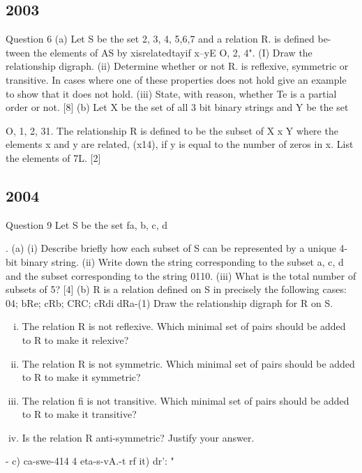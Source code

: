\subsection{2003}
Question 6 (a) Let S be the set {2, 3, 4, 5,6,7} and a relation R. is defined be-
tween the elements of AS by 
xisrelatedtayif x--yE {O, 2, 4}". 
(I) Draw the relationship digraph. 
(ii) Determine whether or not R. is reflexive, symmetric or transitive. In cases 
where one of these properties does not hold give an example to show that 
it does not hold. 
(iii) State, with reason, whether Te is a partial order or not. 
[8] 
(b) Let X be the set of all 3 bit binary strings and Y be the set {O, 1, 2, 31. The 
relationship R is defined to be the subset of X x Y where the elements x and y 
are related, (x14), if y is equal to the number of zeros in x. List the elements 
of 7L. [2] 

\subsection{2004} 
Question 9 Let S be the set fa, b, c, d}. 
(a) (i) Describe briefly how each subset of S can be represented by a unique 4-bit 
binary string. 
(ii) Write down the string corresponding to the subset {a, c, d} and the subset 
corresponding to the string 0110. 
(iii) What is the total number of subsets of 5? [4] 
(b) R is a relation defined on S in precisely the following cases: 
04; bRe; cRb; CRC; cRdi dRa-(1) Draw the relationship digraph for R on S. 
\begin{enumerate}[(i)]
\item  The relation R is not reflexive. Which minimal set of pairs should be 
added to R to make it relexive? 
\item  The relation R is not symmetric. Which minimal set of pairs should be 
added to R to make it symmetric? 
\item  The relation fi is not transitive. Which minimal set of pairs should be 
added to R to make it transitive? 
\item Is the relation R anti-symmetric? Justify your answer. 
\end{enumerate}


- c) ca-swe-414 4 eta-s-vA.-t rf it) dr': "%

